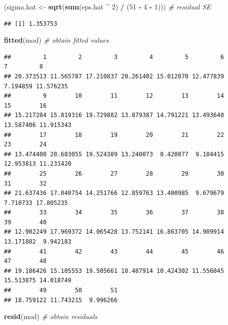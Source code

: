 \documentclass[]{article}
\newenvironment{Shaded}{\begin{snugshade}}{\end{snugshade}}
\newcommand{\CommentTok}[1]{\textcolor[rgb]{0.56,0.35,0.01}{\textit{#1}}}
\newcommand{\DecValTok}[1]{\textcolor[rgb]{0.00,0.00,0.81}{#1}}
\newcommand{\KeywordTok}[1]{\textcolor[rgb]{0.13,0.29,0.53}{\textbf{#1}}}
\newcommand{\NormalTok}[1]{#1}
\newcommand{\OperatorTok}[1]{\textcolor[rgb]{0.81,0.36,0.00}{\textbf{#1}}}
\newcommand{\StringTok}[1]{\textcolor[rgb]{0.31,0.60,0.02}{#1}}
\begin{document}
\begin{Shaded}
\begin{Highlighting}[]
\NormalTok{(sigma.hat <-}\StringTok{ }\KeywordTok{sqrt}\NormalTok{(}\KeywordTok{sum}\NormalTok{(eps.hat }\OperatorTok{^}\StringTok{ }\DecValTok{2}\NormalTok{) }\OperatorTok{/}\StringTok{ }\NormalTok{(}\DecValTok{51} \OperatorTok{-}\StringTok{ }\DecValTok{4} \OperatorTok{-}\StringTok{ }\DecValTok{1}\NormalTok{)))  }\CommentTok{# residual SE}
\end{Highlighting}
\end{Shaded}

\begin{verbatim}
## [1] 1.353753
\end{verbatim}

\begin{Shaded}
\begin{Highlighting}[]
\KeywordTok{fitted}\NormalTok{(mod)  }\CommentTok{# obtain fitted values}
\end{Highlighting}
\end{Shaded}

\begin{verbatim}
##         1         2         3         4         5         6         7         8 
## 20.373513 11.565787 17.210837 20.261402 15.012070 12.477839  7.194859 11.576235 
##         9        10        11        12        13        14        15        16 
## 15.217284 15.819316 19.729882 13.879387 14.791221 13.493640 13.587406 11.915343 
##        17        18        19        20        21        22        23        24 
## 13.474400 20.683055 19.524389 13.240073  8.420077  9.104415 12.953813 11.231420 
##        25        26        27        28        29        30        31        32 
## 21.637436 17.040754 14.251766 12.859763 13.400985  9.679679  7.710733 17.805235 
##        33        34        35        36        37        38        39        40 
## 12.902249 17.969372 14.065428 13.752141 16.863705 14.909914 13.171882  9.942183 
##        41        42        43        44        45        46        47        48 
## 19.186426 15.105553 19.505661 18.487914 10.424302 11.556045 15.513875 14.018749 
##        49        50        51 
## 18.759122 11.743215  9.996266
\end{verbatim}

\begin{Shaded}
\begin{Highlighting}[]
\KeywordTok{resid}\NormalTok{(mod)  }\CommentTok{# obtain residuals}
\end{Highlighting}
\end{Shaded}
\end{document}
